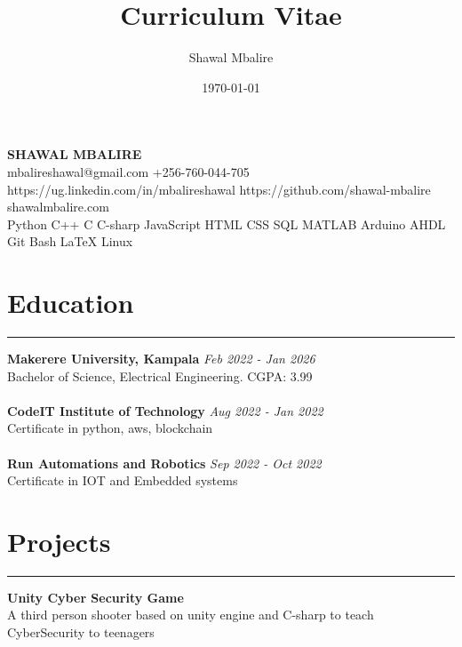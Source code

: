 \documentclass[a4paper]{article}
\title{Curriculum Vitae}
\author{Shawal Mbalire}
\date{\today}
\begin{document}
    \begin{center}
        \LARGE{\bf SHAWAL MBALIRE} \\
        {\small
        mbalireshawal@gmail.com
        +256-760-044-705
        https://ug.linkedin.com/in/mbalireshawal
        https://github.com/shawal-mbalire
        shawalmbalire.com\\
        Python C++ C  C-sharp JavaScript
        HTML CSS SQL MATLAB
        Arduino AHDL Git Bash LaTeX Linux}
    \end{center}

    \begin{minipage}[t]{0.5\textwidth}

        \section*{\bf Education}
        \hrule
        {\bf Makerere University, Kampala}
        \hfil{\em Feb 2022 - Jan 2026}\\
        Bachelor of Science, Electrical Engineering.
        \hfil CGPA: 3.99\\\\
        {\bf CodeIT Institute of Technology}
        \hfil{\em Aug 2022 - Jan 2022}\\
        Certificate in python, aws, blockchain\\\\
        {\bf Run Automations and Robotics}
        \hfil{\em Sep 2022 - Oct 2022}\\
        Certificate in IOT and Embedded systems\\


        \section*{\bf Projects}
        \hrule

        {\bf Unity Cyber Security Game}\\
        A third person shooter based on unity engine and C-sharp to teach CyberSecurity to teenagers


\end{minipage}
\end{document}
